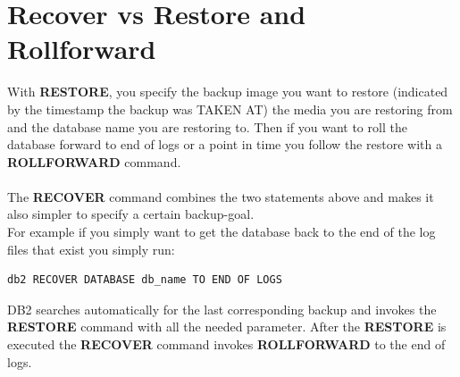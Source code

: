 \documentclass{vldb}
\begin{document}
\section{Recover vs Restore and Rollforward}
With \textbf{RESTORE}, you specify the backup image you want to restore (indicated by the timestamp the backup was TAKEN AT) the media you are restoring from and the database name you are restoring to. Then if you want to roll the database forward to end of logs or a point in time you follow the restore with a \textbf{ROLLFORWARD} command.\\\\ The \textbf{RECOVER} command combines the two statements above and makes it also simpler to specify a certain backup-goal.\\

For example if you simply want to get the database back to the end of the log files that exist you simply run:

 \begin{verbatim}
db2 RECOVER DATABASE db_name TO END OF LOGS
\end{verbatim}

DB2 searches automatically for the last corresponding backup and invokes the \textbf{RESTORE} command with all the needed parameter. After the \textbf{RESTORE} is executed the \textbf{RECOVER} command invokes \textbf{ROLLFORWARD} to the end of logs. 
\end{document}
